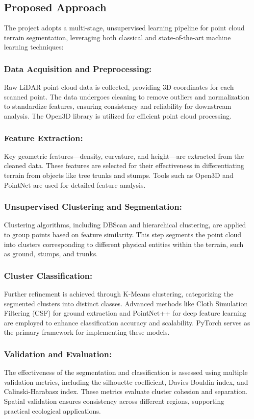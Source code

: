 \documentclass[../report.tex]{subfiles}
\begin{document}
    \subsection{Proposed Approach}
    
    \label{sec:introduction:proposed_approach}
The project adopts a multi-stage, unsupervised learning pipeline for point cloud terrain segmentation, leveraging both classical and state-of-the-art machine learning techniques:
\subsubsection{Data Acquisition and Preprocessing:}
Raw LiDAR point cloud data is collected, providing 3D coordinates for each scanned point. The data undergoes cleaning to remove outliers and normalization to standardize features, ensuring consistency and reliability for downstream analysis. The Open3D library is utilized for efficient point cloud processing.
\subsubsection{Feature Extraction:}
Key geometric features—density, curvature, and height—are extracted from the cleaned data. These features are selected for their effectiveness in differentiating terrain from objects like tree trunks and stumps. Tools such as Open3D and PointNet are used for detailed feature analysis.
\subsubsection{Unsupervised Clustering and Segmentation:}
Clustering algorithms, including DBScan and hierarchical clustering, are applied to group points based on feature similarity. This step segments the point cloud into clusters corresponding to different physical entities within the terrain, such as ground, stumps, and trunks.
\subsubsection{Cluster Classification:}
Further refinement is achieved through K-Means clustering, categorizing the segmented clusters into distinct classes. Advanced methods like Cloth Simulation Filtering (CSF) for ground extraction and PointNet++ for deep feature learning are employed to enhance classification accuracy and scalability. PyTorch serves as the primary framework for implementing these models.
\subsubsection{Validation and Evaluation:}
The effectiveness of the segmentation and classification is assessed using multiple validation metrics, including the silhouette coefficient, Davies-Bouldin index, and Calinski-Harabasz index. These metrics evaluate cluster cohesion and separation. Spatial validation ensures consistency across different regions, supporting practical ecological applications.
\end{document}
